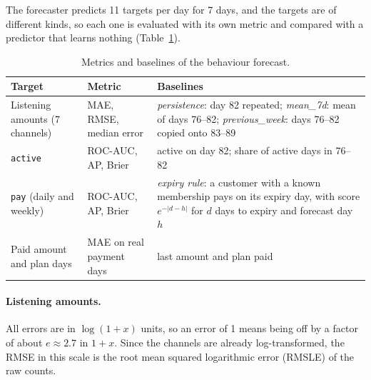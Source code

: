 \documentclass{article}
\begin{document}
The forecaster predicts 11 targets per day for 7 days, and the targets are of different kinds, so each one is evaluated with its own metric and compared with a predictor that learns nothing (Table~\ref{tab:w2_traj_metrics}).

\begin{table}[H]
\centering
\renewcommand{\arraystretch}{1.25}
\begin{tabularx}{\textwidth}{|l|l|X|}
\hline
\textbf{Target} & \textbf{Metric} & \textbf{Baselines} \\ \hline
Listening amounts (7 channels) & MAE, RMSE, median error & \emph{persistence}: day 82 repeated; \emph{mean\_7d}: mean of days 76--82; \emph{previous\_week}: days 76--82 copied onto 83--89 \\ \hline
\texttt{active} & ROC-AUC, AP, Brier & active on day 82; share of active days in 76--82 \\ \hline
\texttt{pay} (daily and weekly) & ROC-AUC, AP, Brier & \emph{expiry rule}: a customer with a known membership pays on its expiry day, with score $e^{-|d - h|}$ for $d$ days to expiry and forecast day $h$ \\ \hline
Paid amount and plan days & MAE on real payment days & last amount and plan paid \\ \hline
\end{tabularx}
\caption{Metrics and baselines of the behaviour forecast.}
\label{tab:w2_traj_metrics}
\end{table}

\paragraph{Listening amounts.} All errors are in $\log(1+x)$ units, so an error of 1 means being off by a factor of about $e \approx 2.7$ in $1+x$. Since the channels are already log-transformed, the RMSE in this scale is the root mean squared logarithmic error (RMSLE) of the raw counts.
\end{document}
